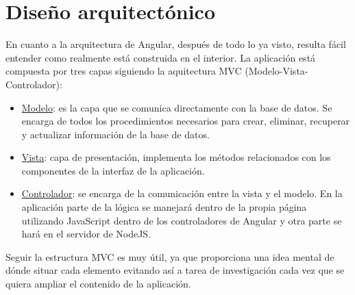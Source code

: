 \section{Diseño arquitectónico}\label{darquitectura}
En cuanto a la arquitectura de Angular, después de todo lo ya visto, resulta fácil entender como realmente está construida en el interior. La aplicación está compuesta por tres capas siguiendo la aquitectura MVC (Modelo-Vista-Controlador):
\begin{itemize}

\item \underline{Modelo}: es la capa que se comunica directamente con la base de datos. Se encarga de todos los procedimientos necesarios para crear, eliminar, recuperar y actualizar información de la base de datos.

\item \underline{Vista}: capa de presentación, implementa los métodos relacionados con los componentes de la interfaz de la aplicación.

 \item \underline{Controlador}: se encarga de la comunicación entre la vista y el modelo. En la aplicación parte de la lógica se manejará dentro de la propia página utilizando JavaScript dentro de los controladores de Angular y otra parte se hará en el servidor de NodeJS.
 


\end{itemize}


Seguir la estructura MVC es muy útil, ya que proporciona una idea mental de dónde situar cada elemento evitando así a tarea de investigación cada vez que se quiera ampliar el contenido de la aplicación.







